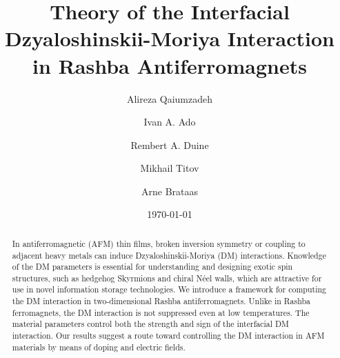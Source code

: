 \documentclass[aps,prl,twocolumn,amsmath,amssymb,superscriptaddress]{revtex4}%
\begin{document}
\title{Theory of the Interfacial Dzyaloshinskii-Moriya Interaction in Rashba Antiferromagnets}

\author{Alireza Qaiumzadeh}

\author{Ivan A. Ado}

\author{Rembert A. Duine}

\author{Mikhail Titov}

\author{Arne Brataas}


\begin{abstract}
In antiferromagnetic (AFM) thin films, broken inversion symmetry or coupling to adjacent heavy metals can induce Dzyaloshinskii-Moriya (DM) interactions. Knowledge of the DM parameters is essential for understanding and designing exotic spin structures, such as hedgehog Skyrmions and chiral N\'{e}el walls, which are attractive for use in novel information storage technologies. We introduce a framework for computing the DM interaction in two-dimensional Rashba antiferromagnets. Unlike in Rashba ferromagnets, the DM interaction is not suppressed even at low temperatures. The material parameters control both the strength and sign of the interfacial DM interaction. Our results suggest a route toward controlling the DM interaction in AFM materials by means of doping and electric fields.
\end{abstract}

\date{\today}
\maketitle
\end{document}

